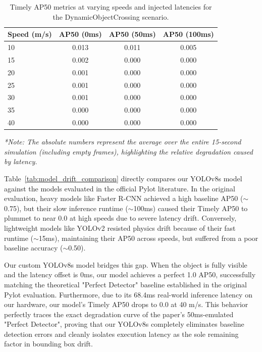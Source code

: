 \documentclass[11pt,a4paper]{report}
\begin{document}
\begin{table}[h!]
\centering
\begin{tabular}{lccc}
\toprule
\textbf{Speed (m/s)} & \textbf{AP50 (0ms)} & \textbf{AP50 (50ms)} & \textbf{AP50 (100ms)} \\
\midrule
10 & 0.013 & 0.011 & 0.005 \\
15 & 0.002 & 0.000 & 0.000 \\
20 & 0.001 & 0.000 & 0.000 \\
25 & 0.001 & 0.000 & 0.000 \\
30 & 0.001 & 0.000 & 0.000 \\
35 & 0.000 & 0.000 & 0.000 \\
40 & 0.000 & 0.000 & 0.000 \\
\bottomrule
\end{tabular}
\vspace{1ex}

{\small \textit{*Note: The absolute numbers represent the average over the entire 15-second simulation (including empty frames), highlighting the relative degradation caused by latency.}}
\caption{Timely AP50 metrics at varying speeds and injected latencies for the DynamicObjectCrossing scenario.}
\label{tab:timely_ap_latency}
\end{table}

Table~\ref{tab:model_drift_comparison} directly compares our YOLOv8s model against the models evaluated in the official Pylot literature. In the original evaluation, heavy models like Faster R-CNN achieved a high baseline AP50 ($\sim$0.75), but their slow inference runtime ($\sim$100ms) caused their Timely AP50 to plummet to near 0.0 at high speeds due to severe latency drift. Conversely, lightweight models like YOLOv2 resisted physics drift because of their fast runtime ($\sim$15ms), maintaining their AP50 across speeds, but suffered from a poor baseline accuracy ($\sim$0.50). 

Our custom YOLOv8s model bridges this gap. When the object is fully visible and the latency offset is 0ms, our model achieves a perfect 1.0 AP50, successfully matching the theoretical "Perfect Detector" baseline established in the original Pylot evaluation. Furthermore, due to its 68.4ms real-world inference latency on our hardware, our model's Timely AP50 drops to 0.0 at 40 m/s. This behavior perfectly traces the exact degradation curve of the paper's 50ms-emulated "Perfect Detector", proving that our YOLOv8s completely eliminates baseline detection errors and cleanly isolates execution latency as the sole remaining factor in bounding box drift.
\end{document}
